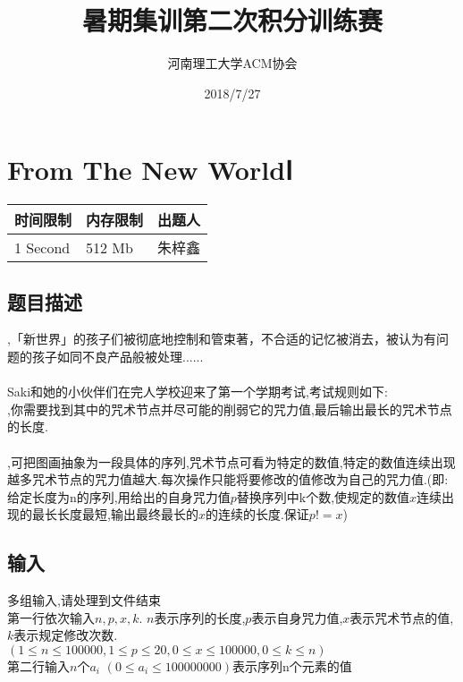 \documentclass[12pt, a4paper]{article}
\title{暑期集训第二次积分训练赛}
\author{河南理工大学ACM协会 }
\date{2018/7/27}
\begin{document}
\maketitle\newpage


\section{From The New WorldⅠ}

\begin{table}[!h]
  \centering
  \begin{tabular}{l|l|l}
  时间限制 & 内存限制 & 出题人 \\
  \hline
  1 Second & 512 Mb & 朱梓鑫 \\
\end{tabular}
\end{table}

\subsection*{题目描述}

,「新世界」的孩子们被彻底地控制和管束著，不合适的记忆被消去，被认为有问题的孩子如同不良产品般被处理......\\
\\
Saki和她的小伙伴们在完人学校迎来了第一个学期考试,考试规则如下:\\
,你需要找到其中的咒术节点并尽可能的削弱它的咒力值,最后输出最长的咒术节点的长度.\\
\\
,可把图画抽象为一段具体的序列,咒术节点可看为特定的数值,特定的数值连续出现越多咒术节点的咒力值越大.每次操作只能将要修改的值修改为自己的咒力值.(即:给定长度为n的序列,用给出的自身咒力值$p$替换序列中k个数,使规定的数值$x$连续出现的最长长度最短,输出最终最长的$x$的连续的长度.保证$p!=x$)
\subsection*{输入}

多组输入,请处理到文件结束\\
第一行依次输入$n,p,x,k$. $n$表示序列的长度,$p$表示自身咒力值,$x$表示咒术节点的值,$k$表示规定修改次数.\\
$(1 \leq n \leq 100000,1 \leq p \leq 20,0 \leq x \leq 100000,0 \leq k \leq n)$\\
第二行输入$n$个$a_i $ $(0 \leq a_i \leq 100000000)$表示序列n个元素的值\\
\end{document}
